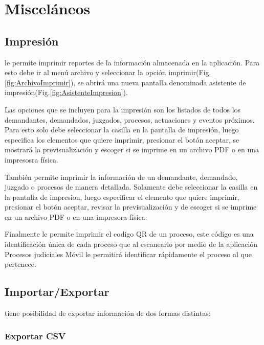 \chapter{Miscel\'aneos}
\label{sec:miscelaneo}

\section{Impresi\'on}

\softwareAbogadosDesktop le permite imprimir reportes de la informaci\'on almacenada en la aplicación. Para esto debe ir al men\'u archivo y seleccionar la opci\'on imprimir(Fig.\ref{fig:ArchivoImprimir}), se abrir\'a una nueva pantalla denominada asistente de impresi\'on(Fig.\ref{fig:AsistenteImpresion}). 
  

Las opciones que se incluyen para la impresi\'on son los listados de todos los  demandantes, demandados, juzgados, procesos, actuaciones y eventos pr\'oximos. Para esto solo debe seleccionar la casilla en la pantalla de impresi\'on, luego especifica los elementos que quiere imprimir, presionar el bot\'on aceptar, se mostrar\'a la previsualizaci\'on y escoger si se imprime en un archivo PDF o en una impresosra f\'isica.
 
Tambi\'en permite imprimir la informaci\'on de un demandante, demandado, juzgado o procesos de manera detallada. Solamente debe seleccionar la casilla en la pantalla de impresion, luego especificar el elemento que quiere imprimir, presionar el bot\'on aceptar, revisar la previsualizaci\'on y de escoger si se imprime en un archivo PDF o en una impresora f\'isica.
 
Finalmente le permite imprimir el codigo QR de un proceso, este c\'odigo es una identificaci\'on \'unica de cada proceso que al escanearlo por medio de la aplicación Procesos judiciales M\'ovil le permitir\'a identificar r\'apidamente el proceso al que pertenece.

\section{Importar/Exportar}

\softwareAbogadosDesktop tiene posibilidad de exportar informaci\'on de dos formas distintas:

\subsection{Exportar CSV}

